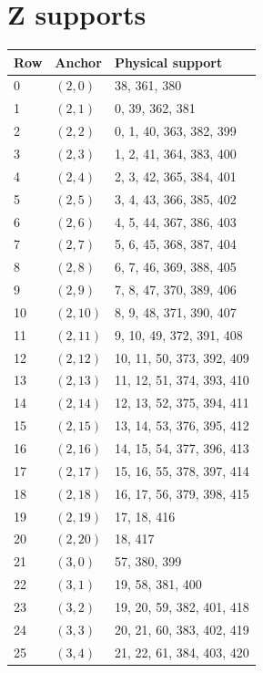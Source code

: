 \documentclass{article}
\begin{document}
\section{Z supports}\label{sec:z-supports}

\begin{longtable}{lll}
  Row & Anchor & Physical support \\
  \hline
  \endhead
  0 & \((2, 0)\) & 38, 361, 380 \\
  1 & \((2, 1)\) & 0, 39, 362, 381 \\
  2 & \((2, 2)\) & 0, 1, 40, 363, 382, 399 \\
  3 & \((2, 3)\) & 1, 2, 41, 364, 383, 400 \\
  4 & \((2, 4)\) & 2, 3, 42, 365, 384, 401 \\
  5 & \((2, 5)\) & 3, 4, 43, 366, 385, 402 \\
  6 & \((2, 6)\) & 4, 5, 44, 367, 386, 403 \\
  7 & \((2, 7)\) & 5, 6, 45, 368, 387, 404 \\
  8 & \((2, 8)\) & 6, 7, 46, 369, 388, 405 \\
  9 & \((2, 9)\) & 7, 8, 47, 370, 389, 406 \\
  10 & \((2, 10)\) & 8, 9, 48, 371, 390, 407 \\
  11 & \((2, 11)\) & 9, 10, 49, 372, 391, 408 \\
  12 & \((2, 12)\) & 10, 11, 50, 373, 392, 409 \\
  13 & \((2, 13)\) & 11, 12, 51, 374, 393, 410 \\
  14 & \((2, 14)\) & 12, 13, 52, 375, 394, 411 \\
  15 & \((2, 15)\) & 13, 14, 53, 376, 395, 412 \\
  16 & \((2, 16)\) & 14, 15, 54, 377, 396, 413 \\
  17 & \((2, 17)\) & 15, 16, 55, 378, 397, 414 \\
  18 & \((2, 18)\) & 16, 17, 56, 379, 398, 415 \\
  19 & \((2, 19)\) & 17, 18, 416 \\
  20 & \((2, 20)\) & 18, 417 \\
  21 & \((3, 0)\) & 57, 380, 399 \\
  22 & \((3, 1)\) & 19, 58, 381, 400 \\
  23 & \((3, 2)\) & 19, 20, 59, 382, 401, 418 \\
  24 & \((3, 3)\) & 20, 21, 60, 383, 402, 419 \\
  25 & \((3, 4)\) & 21, 22, 61, 384, 403, 420 \\

\end{longtable}
\end{document}
